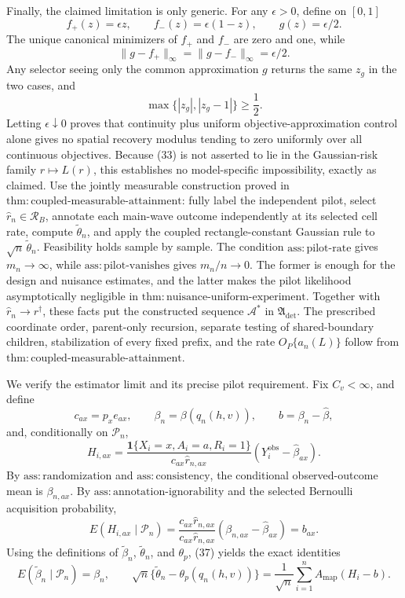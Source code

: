 Finally, the claimed limitation is only generic. For any \(\epsilon>0\), define on \([0,1]\)
\[
f_+(z)=\epsilon z,\qquad f_-(z)=\epsilon(1-z),\qquad g(z)=\epsilon/2.
\tag{33}
\]
The unique canonical minimizers of \(f_+\) and \(f_-\) are zero and one, while
\[
\lVert g-f_+\rVert_\infty=\lVert g-f_-\rVert_\infty=\epsilon/2.
\tag{34}
\]
Any selector seeing only the common approximation \(g\) returns the same \(z_g\) in the two cases, and
\[
\max\{|z_g|,|z_g-1|\}\ge\frac12.
\tag{35}
\]
Letting \(\epsilon\downarrow0\) proves that continuity plus uniform objective-approximation control alone gives no spatial recovery modulus tending to zero uniformly over all continuous objectives. Because (33) is not asserted to lie in the Gaussian-risk family \(r\mapsto L(r)\), this establishes no model-specific impossibility, exactly as claimed.
Use the jointly measurable construction proved in \(\mathrm{thm:coupled\text{-}measurable\text{-}attainment}\): fully label the independent pilot, select \(\widehat r_n\in\mathcal R_B\), annotate each main-wave outcome independently at its selected cell rate, compute \(\widetilde\theta_n\), and apply the coupled rectangle-constant Gaussian rule to \(\sqrt n\,\widetilde\theta_n\). Feasibility holds sample by sample. The condition \(\mathrm{ass:pilot\text{-}rate}\) gives \(m_n\to\infty\), while \(\mathrm{ass:pilot\text{-}vanishes}\) gives \(m_n/n\to0\). The former is enough for the design and nuisance estimates, and the latter makes the pilot likelihood asymptotically negligible in \(\mathrm{thm:nuisance\text{-}uniform\text{-}experiment}\). Together with \(\widehat r_n\to r^\dagger\), these facts put the constructed sequence \(\mathcal A^*\) in \(\mathfrak A_{\mathrm{det}}\). The prescribed coordinate order, parent-only recursion, separate testing of shared-boundary children, stabilization of every fixed prefix, and the rate \(O_P\{a_n(L)\}\) follow from \(\mathrm{thm:coupled\text{-}measurable\text{-}attainment}\).

We verify the estimator limit and its precise pilot requirement. Fix \(C_v<\infty\), and define
\[
c_{ax}=p_xe_{ax},\qquad
\beta_n=\beta(q_n(h,v)),\qquad
b=\beta_n-\widehat\beta,
\]
and, conditionally on \(\mathscr P_n\),
\[
H_{i,ax}=\frac{\mathbf1\{X_i=x,A_i=a,R_i=1\}}
{c_{ax}\widehat r_{n,ax}}
(Y_i^{\mathrm{obs}}-\widehat\beta_{ax}).
\tag{36}
\]
By \(\mathrm{ass:randomization}\) and \(\mathrm{ass:consistency}\), the conditional observed-outcome mean is \(\beta_{n,ax}\). By \(\mathrm{ass:annotation\text{-}ignorability}\) and the selected Bernoulli acquisition probability,
\[
E(H_{i,ax}\mid\mathscr P_n)
=\frac{c_{ax}\widehat r_{n,ax}}
{c_{ax}\widehat r_{n,ax}}
(\beta_{n,ax}-\widehat\beta_{ax})=b_{ax}.
\tag{37}
\]
Using the definitions of \(\widetilde\beta_n\), \(\widetilde\theta_n\), and \(\theta_p\), (37) yields the exact identities
\[
E(\widetilde\beta_n\mid\mathscr P_n)=\beta_n,
\qquad
\sqrt n\{\widetilde\theta_n-\theta_p(q_n(h,v))\}
=\frac1{\sqrt n}\sum_{i=1}^nA_{\mathrm{map}}(H_i-b).
\tag{38}
\]

